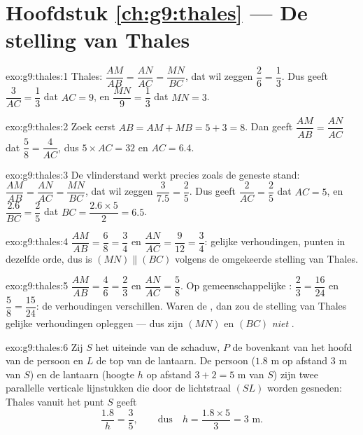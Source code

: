 \section*{Hoofdstuk \ref{ch:g9:thales} --- De stelling van Thales}

\begin{solution}{exo:g9:thales:1}
Thales: $\dfrac{AM}{AB} = \dfrac{AN}{AC} = \dfrac{MN}{BC}$, dat wil zeggen
$\dfrac26 = \dfrac13$. Dus geeft $\dfrac{3}{AC} = \dfrac13$ dat $AC = 9$, en
$\dfrac{MN}{9} = \dfrac13$ dat $MN = 3$.
\end{solution}

\begin{solution}{exo:g9:thales:2}
Zoek eerst $AB = AM + MB = 5 + 3 = 8$. Dan geeft
$\dfrac{AM}{AB} = \dfrac{AN}{AC}$ dat $\dfrac58 = \dfrac{4}{AC}$, dus
$5 \times AC = 32$ en $AC = 6.4$.
\end{solution}

\begin{solution}{exo:g9:thales:3}
De vlinderstand werkt precies zoals de geneste stand:
$\dfrac{AM}{AB} = \dfrac{AN}{AC} = \dfrac{MN}{BC}$, dat wil zeggen
$\dfrac{3}{7.5} = \dfrac25$. Dus geeft $\dfrac{2}{AC} = \dfrac25$ dat $AC = 5$, en
$\dfrac{2.6}{BC} = \dfrac25$ dat $BC = \dfrac{2.6 \times 5}{2} = 6.5$.
\end{solution}

\begin{solution}{exo:g9:thales:4}
$\dfrac{AM}{AB} = \dfrac68 = \dfrac34$ en
$\dfrac{AN}{AC} = \dfrac{9}{12} = \dfrac34$: gelijke verhoudingen, punten in
dezelfde orde, dus is $(MN) \parallel (BC)$ volgens de omgekeerde stelling van
Thales.
\end{solution}

\begin{solution}{exo:g9:thales:5}
$\dfrac{AM}{AB} = \dfrac46 = \dfrac23$ en $\dfrac{AN}{AC} = \dfrac58$. Op
gemeenschappelijke : $\dfrac23 = \dfrac{16}{24}$ en
$\dfrac58 = \dfrac{15}{24}$: de verhoudingen verschillen. Waren de 
, dan zou de stelling van Thales gelijke verhoudingen opleggen --- dus
zijn $(MN)$ en $(BC)$ \emph{niet} .
\end{solution}

\begin{solution}{exo:g9:thales:6}
Zij $S$ het uiteinde van de schaduw, $P$ de bovenkant van het hoofd van de persoon
en $L$ de top van de lantaarn. De persoon ($1.8$ m op afstand $3$ m van $S$) en de
lantaarn (hoogte $h$ op afstand $3 + 2 = 5$ m van $S$) zijn twee parallelle
verticale lijnstukken die door de lichtstraal $(SL)$ worden gesneden: Thales vanuit
het punt $S$ geeft
\[
\frac{1.8}{h} = \frac{3}{5},
\qquad\text{dus}\quad
h = \frac{1.8 \times 5}{3} = 3 \text{ m}.
\]
\end{solution}

